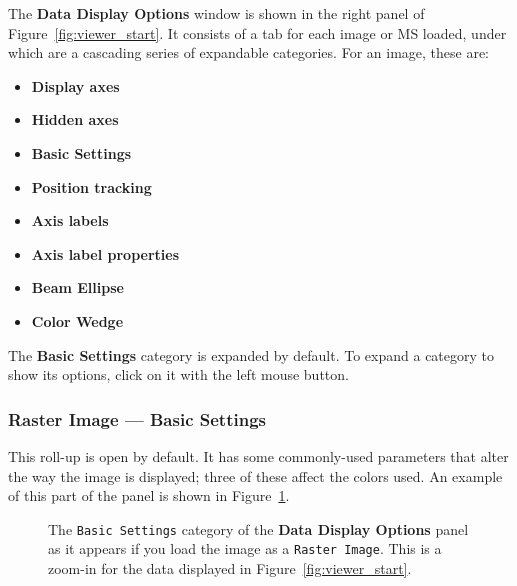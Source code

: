 The {\bf Data Display Options} window is shown in the right panel
of Figure~\ref{fig:viewer_start}.  It consists of a tab for each
image or MS loaded, under which are a cascading series of expandable
categories.  For an image, these are:
\begin{itemize}
   \item {\bf Display axes}
   \item {\bf Hidden axes}
   \item {\bf Basic Settings}
   \item {\bf Position tracking}
   \item {\bf Axis labels}
   \item {\bf Axis label properties}
   \item {\bf Beam Ellipse}
   \item {\bf Color Wedge}
\end{itemize}
The {\bf Basic Settings} category is expanded by
default.  To expand a category to show its options, click on it with
the left mouse button.


\subsubsection{Raster Image --- Basic Settings}
\label{section:display.image.raster.adjust.basic}

This roll-up is open by default.  It has some commonly-used parameters
that alter the way the image is displayed; three of these affect the
colors used. An example of this part of the panel is shown in
Figure~\ref{fig:viewer_raster_basic}.

\begin{figure}[h!]
\begin{center}
\caption{\label{fig:viewer_raster_basic} The {\tt Basic Settings}
category of the {\bf Data Display Options} panel
as it appears if you load the image as a {\tt Raster Image}.
This is a zoom-in for the data displayed in Figure~\ref{fig:viewer_start}.}
\hrulefill
\end{center}
\end{figure}

